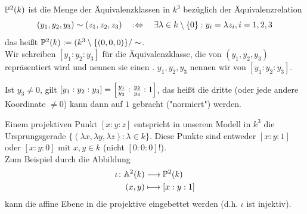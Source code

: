 \begin{defn}
	$\mathbb{P}^2(k)$ ist die Menge der Äquivalenzklassen in $k^3$ bezüglich der Äquivalenzrelation
	\[ (y_1,y_2,y_3) \sim (z_1,z_2,z_3) \quad :\Leftrightarrow \quad \exists \lambda \in k \setminus \{0\} : y_i = \lambda z_i, i = 1, 2, 3 \]
	das heißt $\mathbb{P}^2(k) := (k^3 \setminus \{(0,0,0)\} / \sim$. \\
	Wir schreiben $[y_1 : y_2 : y_3]$ für die Äquivalenzklasse, die von $(y_1,y_2,y_3)$ repräsentiert wird und nennen sie einen . 
	$y_1,y_2,y_3$ nennen wir  von $[y_1: y_2 : y_3]$.
\end{defn}

\begin{bem}
	Ist $y_3 \neq 0$, gilt $[y_1 : y_2 : y_3] = \left\lbrack\frac{y_1}{y_3} : \frac{y_2}{y_3} : 1\right\rbrack$, das heißt die dritte (oder jede andere Koordinate $\neq 0$) kann dann auf $1$ gebracht ("normiert") werden.
\end{bem}

Einem projektiven Punkt $[x:y:z]$ entspricht in unserem Modell in $k^3$ die Ursprungsgerade $\{(\lambda x, \lambda y, \lambda z) : \lambda \in k\}$. 
Diese Punkte sind entweder $[x:y:1]$ oder $[x:y:0]$ mit $x,y \in k$ (nicht $[0:0:0]$!). \\
Zum Beispiel durch die Abbildung
\begin{equation}
\begin{aligned}
	\iota\colon \mathbb{A}^2(k) &\longrightarrow \mathbb{P}^2(k) \\
	(x,y) &\longmapsto [x:y:1]
\end{aligned}
\end{equation}
kann die affine Ebene in die projektive eingebettet werden (d.h. $\iota$ ist injektiv).
\begin{figure}[h]
	\centering
\end{figure}

